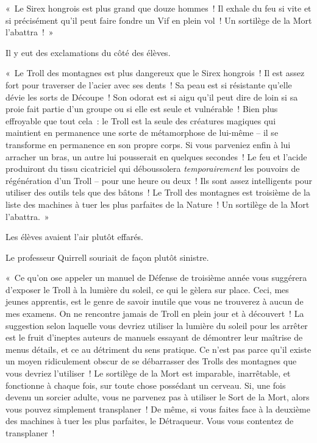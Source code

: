 «~Le Sirex hongrois est plus grand que douze hommes~! Il exhale du feu si vite et si précisément qu'il peut faire fondre un Vif en plein vol~! Un sortilège de la Mort l'abattra~!~»

Il y eut des exclamations du côté des élèves.

«~Le Troll des montagnes est plus dangereux que le Sirex hongrois~! Il est assez fort pour traverser de l'acier avec ses dents~! Sa peau est si résistante qu'elle dévie les sorts de Découpe~! Son odorat est si aigu qu'il peut dire de loin si sa proie fait partie d'un groupe ou si elle est seule et vulnérable~! Bien plus effroyable que tout cela~: le Troll est la seule des créatures magiques qui maintient en permanence une sorte de métamorphose de lui-même -- il se transforme en permanence en son propre corps. Si vous parveniez enfin à lui arracher un bras, un autre lui pousserait en quelques secondes~! Le feu et l'acide produiront du tissu cicatriciel qui déboussolera \emph{temporairement} les pouvoirs de régénération d'un Troll -- pour une heure ou deux~! Ils sont assez intelligents pour utiliser des outils tels que des bâtons~! Le Troll des montagnes est troisième de la liste des machines à tuer les plus parfaites de la Nature~! Un sortilège de la Mort l'abattra.~»

Les élèves avaient l'air plutôt effarés.

Le professeur Quirrell souriait de façon plutôt sinistre.

«~Ce qu'on ose appeler un manuel de Défense de troisième année vous suggérera d'exposer le Troll à la lumière du soleil, ce qui le gèlera sur place. Ceci, mes jeunes apprentis, est le genre de savoir inutile que vous ne trouverez à aucun de mes examens. On ne rencontre jamais de Troll en plein jour et à découvert~! La suggestion selon laquelle vous devriez utiliser la lumière du soleil pour les arrêter est le fruit d'ineptes auteurs de manuels essayant de démontrer leur maîtrise de menus détails, et ce au détriment du sens pratique. Ce n'est pas parce qu'il existe un moyen ridiculement obscur de se débarrasser des Trolls des montagnes que vous devriez l'utiliser~! Le sortilège de la Mort est imparable, inarrêtable, et fonctionne à chaque fois, sur toute chose possédant un cerveau. Si, une fois devenu un sorcier adulte, vous ne parvenez pas à utiliser le Sort de la Mort, alors vous pouvez simplement transplaner~! De même, si vous faites face à la deuxième des machines à tuer les plus parfaites, le Détraqueur. Vous vous contentez de transplaner~!

